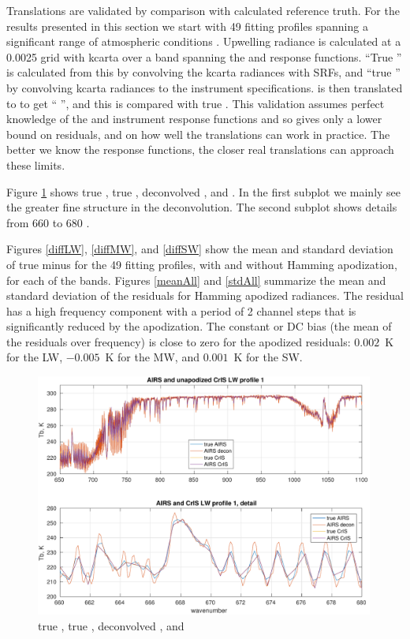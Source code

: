 \documentclass[12pt]{article}
\begin{document}
Translations are validated by comparison with calculated reference
truth.  For the results presented in this section we start with 49
fitting profiles spanning a significant range of atmospheric
conditions \cite{sarta1,sarta2}.  Upwelling radiance is calculated
at a 0.0025 {\wn} grid with kcarta \cite{kcarta1} over a band
spanning the {\airs} and {\cris} response functions.  ``True
{\airs}'' is calculated from this by convolving the kcarta radiances
with {\airs} SRFs, and ``true {\cris}'' by convolving kcarta
radiances to the {\cris} instrument specifications.  {\airs} is then
translated to {\cris} to get ``{\airs} {\cris}'', and this is
compared with true {\cris}.  This validation assumes perfect
knowledge of the {\airs} and {\cris} instrument response functions
and so gives only a lower bound on residuals, and on how well the
translations can work in practice.  The better we know the response
functions, the closer real translations can approach these limits.

Figure \ref{specLW} shows true {\cris}, true {\airs}, deconvolved
{\airs}, and {\airs} {\cris}.  In the first subplot we mainly see
the greater fine structure in the deconvolution.  The second subplot
shows details from 660 to 680 {\wn}.  

Figures \ref{diffLW}, \ref{diffMW}, and \ref{diffSW} show the mean
and standard deviation of true {\cris} minus {\airs} {\cris} for the
49 fitting profiles, with and without Hamming apodization, for each
of the {\cris} bands.  Figures \ref{meanAll} and \ref{stdAll}
summarize the mean and standard deviation of the residuals for
Hamming apodized radiances.  The residual has a high frequency
component with a period of 2 channel steps that is significantly
reduced by the apodization.  The constant or DC bias (the mean of
the residuals over frequency) is close to zero for the apodized
residuals: $0.002$~K for the LW, $-0.005$~K for the MW, and
$0.001$~K for the SW.

\begin{figure} %
  \centering
  \includegraphics[height=8cm]{figures/a2cris_spec_LW.pdf}
  \caption{true {\cris}, true {\airs}, deconvolved {\airs}, and
    {\airs} {\cris}}
  \label{specLW}
\end{figure}
\end{document}
